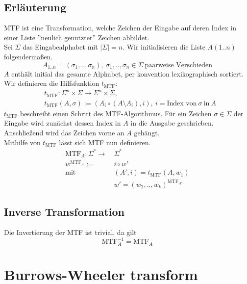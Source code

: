 \documentclass{article}
\begin{document}
\subsection{Erläuterung}
MTF ist eine Transformation, welche Zeichen der Eingabe auf deren Index in einer Liste ''neulich genutzter'' Zeichen abbildet.
\\[.5cm]
Sei $\Sigma$ das Eingabealphabet mit $|\Sigma|=n$. Wir initialisieren die Liste $A(1..n)$ folgendermaßen.
\begin{equation}
    A_{1..n}=(\sigma_1,..,\sigma_n),~\sigma_1,..,\sigma_n\in\Sigma~\text{paarweise Verschieden}
\end{equation}
$A$ enthält initial das gesamte Alphabet, per konvention lexikographisch sortiert.
\\[.5cm]
Wir definieren die Hilfsfunktion $t_{\text{MTF}}$:
\begin{equation}
\begin{split}
    &t_{\text{MTF}}:\Sigma^n\times\Sigma\rightarrow\Sigma^n\times\Sigma,\\
    &t_{\text{MTF}}(A,\sigma):=(A_i\circ(A\setminus A_i),i),~i=\text{Index von}~\sigma~\text{in}~A
\end{split}
\end{equation}
$t_{\text{MTF}}$ beschreibt einen Schritt des MTF-Algorithmus. Für ein Zeichen $\sigma\in\Sigma$ der Eingabe wird zunächst dessen Index in $A$ in die Ausgabe geschrieben. Anschließend wird das Zeichen vorne an $A$ gehängt.
\\[.5cm]
Mithilfe von $t_{\text{MTF}}$ lässt sich MTF nun definieren.
\begin{equation}
\begin{split}
    \text{MTF}_A:\Sigma^*\rightarrow~&\Sigma^*\\
    w^{\text{MTF}_A}:=~&i\circ w'\\
    \text{mit}~&(A',i)=t_{\text{MTF}}(A,w_1)\\
    &w'=(w_2,..,w_k)^{\text{MTF}_{A'}}
\end{split}
\end{equation}
\subsection{Inverse Transformation}
Die Invertierung der MTF ist trivial, da gilt
\begin{equation}
    \text{MTF}_A^{-1}=\text{MTF}_A
\end{equation}
\newpage
\section{Burrows-Wheeler transform}
\end{document}
